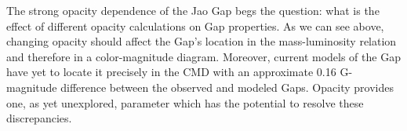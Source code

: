 
The strong opacity dependence of the Jao Gap begs the question: what is
the effect of different opacity calculations on Gap properties.
As we can see above, changing opacity should affect the Gap's location in the
mass-luminosity relation and therefore in a color-magnitude diagram. Moreover,
current models of the Gap have yet to locate it precisely in the CMD
\citep{Feiden2021} with an approximate 0.16 G-magnitude difference between the
observed and modeled Gaps. Opacity provides one, as yet unexplored, parameter
which has the potential to resolve these discrepancies.
